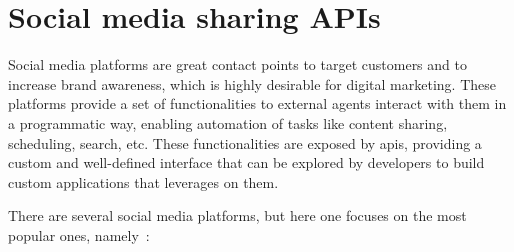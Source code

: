 \section{Social media sharing APIs}
\label{sec:social-media-sharing}
Social media platforms are great contact points to target customers and to
increase brand awareness, which is highly desirable for digital marketing. These
platforms provide a set of functionalities to external agents interact with them
in a programmatic way, enabling automation of tasks like content sharing,
scheduling, search, etc.
These functionalities are exposed by \glspl{api}, providing a custom and
well-defined interface that can be explored by developers to build custom
applications that leverages on them.

There are several social media platforms, but here one focuses on the most
popular ones, namely~\cite{rakutenTop10SMApis, ayrshareTop10SMApis}:
